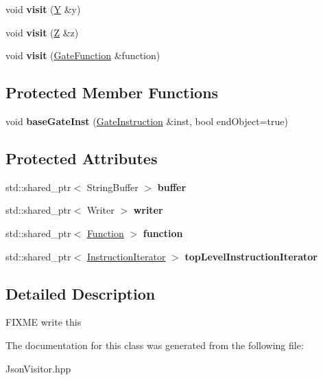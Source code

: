 \begin{DoxyCompactItemize}
\item 
void {\bfseries visit} (\hyperlink{a00075}{Y} \&y)\hypertarget{a00044_a5f08b133da5ae583b40d3324220e68e3}{}\label{a00044_a5f08b133da5ae583b40d3324220e68e3}

\item 
void {\bfseries visit} (\hyperlink{a00076}{Z} \&z)\hypertarget{a00044_a1e1a24feb419b275e2873575242ecbfd}{}\label{a00044_a1e1a24feb419b275e2873575242ecbfd}

\item 
void {\bfseries visit} (\hyperlink{a00032}{Gate\+Function} \&function)\hypertarget{a00044_af80f9bd5dda7f53279baa9823c715f60}{}\label{a00044_af80f9bd5dda7f53279baa9823c715f60}

\end{DoxyCompactItemize}
\subsection*{Protected Member Functions}
\begin{DoxyCompactItemize}
\item 
void {\bfseries base\+Gate\+Inst} (\hyperlink{a00033}{Gate\+Instruction} \&inst, bool end\+Object=true)\hypertarget{a00044_adf4795f80bf4773af8babb9ee7d38c96}{}\label{a00044_adf4795f80bf4773af8babb9ee7d38c96}

\end{DoxyCompactItemize}
\subsection*{Protected Attributes}
\begin{DoxyCompactItemize}
\item 
std\+::shared\+\_\+ptr$<$ String\+Buffer $>$ {\bfseries buffer}\hypertarget{a00044_a79e14ac35a004c64f3b6a5c684d73598}{}\label{a00044_a79e14ac35a004c64f3b6a5c684d73598}

\item 
std\+::shared\+\_\+ptr$<$ Writer $>$ {\bfseries writer}\hypertarget{a00044_a4433a92e0c5a1ede71223c275a495241}{}\label{a00044_a4433a92e0c5a1ede71223c275a495241}

\item 
std\+::shared\+\_\+ptr$<$ \hyperlink{a00030}{Function} $>$ {\bfseries function}\hypertarget{a00044_ae943110fac6aa057637fbdf76c39ba9c}{}\label{a00044_ae943110fac6aa057637fbdf76c39ba9c}

\item 
std\+::shared\+\_\+ptr$<$ \hyperlink{a00038}{Instruction\+Iterator} $>$ {\bfseries top\+Level\+Instruction\+Iterator}\hypertarget{a00044_a84ac738710890faa124c0df935bc51d5}{}\label{a00044_a84ac738710890faa124c0df935bc51d5}

\end{DoxyCompactItemize}


\subsection{Detailed Description}
F\+I\+X\+ME write this 

The documentation for this class was generated from the following file\+:\begin{DoxyCompactItemize}
\item 
Json\+Visitor.\+hpp\end{DoxyCompactItemize}
